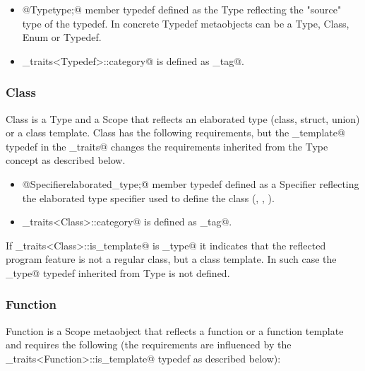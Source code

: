 \begin{itemize}
	\item{\verb@typedef @{\metaobject Type}\verb@ type;@} member typedef
	defined as the {\metaobject Type} reflecting the "source" type of the typedef.
	In concrete {\metaobject Typedef} metaobjects \verb@type@ can be a 
	{\metaobject Type}, {\metaobject Class}, {\metaobject Enum} or {\metaobject Typedef}.

	\item \verb@metaobject_traits<Typedef>::category@ is defined as \verb@typedef_tag@.
\end{itemize}

\subsubsection{Class}

{\metaobject Class} is a {\metaobject Type} and a {\metaobject Scope} that reflects
an elaborated type (class, struct, union) or a class template.
{\metaobject Class} has the following requirements, but
the \verb@is_template@ typedef in the \verb@metaobject_traits@ changes the requirements
inherited from the {\metaobject Type} concept as described below.

\begin{itemize}
	\item{\verb@typedef @{\metaobject Specifier}\verb@ elaborated_type;@}
	member typedef defined as a {\metaobject Specifier} reflecting the elaborated
	type specifier used to define the class (\verb@class@, \verb@struct@, \verb@union@).

	\item \verb@metaobject_traits<Class>::category@ is defined as \verb@class_tag@.
\end{itemize}

If \verb@metaobject_traits<Class>::is_template@ is \verb@true_type@ it indicates 
that the reflected program feature is not a regular class, but a class template.
In such case the \verb@original_type@ typedef inherited from {\metaobject Type}
is not defined.

\subsubsection{Function}

{\metaobject Function} is a {\metaobject Scope} metaobject that reflects a function
or a function template and requires the following (the requirements are influenced
by the \verb@metaobject_traits<Function>::is_template@ typedef as described below):

